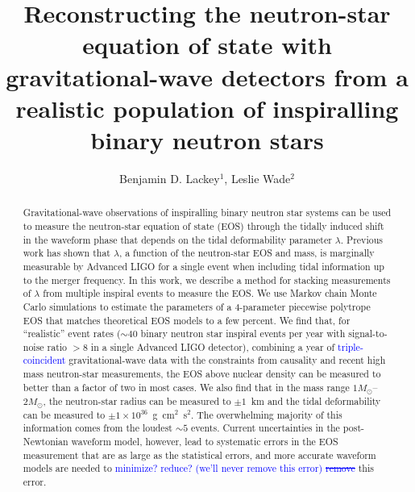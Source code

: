 \documentclass[twocolumn,prd,amssymb,aps,nofootinbib,showpacs,epsf]{revtex4}
\newcommand\les[2]{\textcolor{blue}{{#1}\sout{#2}}}
\begin{document}
\title{Reconstructing the neutron-star equation of state with gravitational-wave detectors from a realistic population of inspiralling binary neutron stars}

\author{Benjamin D. Lackey$^1$, Leslie Wade$^2$}


\begin{abstract}
Gravitational-wave observations of inspiralling binary neutron star systems can be used to measure the neutron-star equation of state (EOS) through the tidally induced shift in the waveform phase that depends on the tidal deformability parameter $\lambda$. Previous work has shown that $\lambda$, a function of the neutron-star EOS and mass, is marginally measurable by Advanced LIGO for a single event when including tidal information up to the merger frequency. In this work, we describe a method for stacking measurements of $\lambda$ from multiple inspiral events to measure the EOS. We use Markov chain Monte Carlo simulations to estimate the parameters of a 4-parameter piecewise polytrope EOS that matches theoretical EOS models to a few percent. We find that, for ``realistic'' event rates ($\sim 40$ binary neutron star inspiral events per year with signal-to-noise ratio $> 8$ in a single Advanced LIGO detector), combining a year of \les{triple-coincident}{} gravitational-wave data with the constraints from causality and recent high mass neutron-star measurements, the EOS above nuclear density can be measured to better than a factor of two in most cases. We also find that in the mass range $1M_\odot$--$2M_\odot$, the neutron-star radius can be measured to $\pm 1$~km and the tidal deformability can be measured to $\pm 1 \times 10^{36}$~g~cm$^2$~s$^2$. The overwhelming majority of this information comes from the loudest $\sim 5$ events. Current uncertainties in the post-Newtonian waveform model, however, lead to systematic errors in the EOS measurement that are as large as the statistical errors, and more accurate waveform models are needed to \les{minimize? reduce? (we'll never remove this error) }{remove} this error.
\end{abstract}

\end{document}
